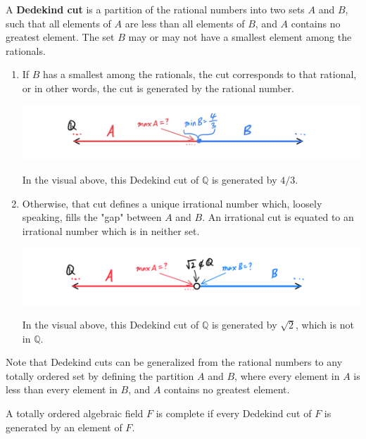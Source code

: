 \documentclass{article}
\begin{document}
      \begin{definition}
        A \textbf{Dedekind cut} is a partition of the rational numbers into two sets $A$ and $B$, such that all elements of $A$ are less than all elements of $B$, and $A$ contains no greatest element. The set $B$ may or may not have a smallest element among the rationals. 
        \begin{enumerate}
        \item If $B$ has a smallest among the rationals, the cut corresponds to that rational, or in other words, the cut is generated by the rational number. 
        \begin{center}
          \includegraphics[scale=0.25]{img/Dedekind_Cut_Rational.PNG}
        \end{center}
        In the visual above, this Dedekind cut of $\mathbb{Q}$ is generated by $4/3$. 
        \item Otherwise, that cut defines a unique irrational number which, loosely speaking, fills the "gap" between $A$ and $B$. An irrational cut is equated to an irrational number which is in neither set. 
        \begin{center}
          \includegraphics[scale=0.25]{img/Dedekind_Cut_Irrational.PNG}
        \end{center}
        In the visual above, this Dedekind cut of $\mathbb{Q}$ is generated by $\sqrt{2}$, which is not in $\mathbb{Q}$. 
        \end{enumerate}
        Note that Dedekind cuts can be generalized from the rational numbers to any totally ordered set by defining the partition $A$ and $B$, where every element in $A$ is less than every element in $B$, and $A$ contains no greatest element. 
      \end{definition}

      \begin{definition}
        A totally ordered algebraic field $F$ is complete if every Dedekind cut of $F$ is generated by an element of $F$. 
      \end{definition} 
\end{document}
